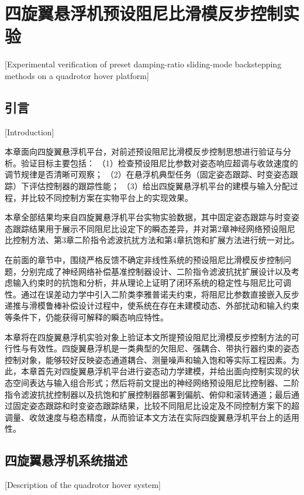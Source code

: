 
\chapter{四旋翼悬浮机预设阻尼比滑模反步控制实验}
[Experimental verification of preset damping-ratio sliding-mode backstepping methods on a quadrotor hover platform]

\section{引言}[Introduction]

本章面向四旋翼悬浮机平台，对前述预设阻尼比滑模反步控制思想进行验证与分析。验证目标主要包括：
（1）检查预设阻尼比参数对姿态响应超调与收敛速度的调节规律是否清晰可观察；
（2）在悬浮机典型任务（固定姿态跟踪、时变姿态跟踪）下评估控制器的跟踪性能；
（3）给出四旋翼悬浮机平台的建模与输入分配过程，并比较不同控制方案在实物平台上的实现效果。

本章全部结果均来自四旋翼悬浮机平台实物实验数据，其中固定姿态跟踪与时变姿态跟踪结果用于展示不同阻尼比设定下的瞬态差异，并对第2章神经网络预设阻尼比控制方法、第3章二阶指令滤波抗扰方法和第4章抗饱和扩展方法进行统一对比。

在前面的章节中，围绕严格反馈不确定非线性系统的预设阻尼比滑模反步控制问题，分别完成了神经网络补偿基准控制器设计、二阶指令滤波抗扰扩展设计以及考虑输入约束时的抗饱和分析，并从理论上证明了闭环系统的稳定性与阻尼比可调性。通过在误差动力学中引入二阶类李雅普诺夫约束，将阻尼比参数直接嵌入反步递推与滑模鲁棒补偿设计过程中，使系统在存在未建模动态、外部扰动和输入约束等条件下，仍能获得可解释的瞬态响应特性。

本章将在四旋翼悬浮机实验对象上验证本文所提预设阻尼比滑模反步控制方法的可行性与有效性。四旋翼悬浮机是一类典型的欠阻尼、强耦合、带执行器约束的姿态控制对象，能够较好反映姿态通道耦合、测量噪声和输入饱和等实际工程因素。为此，本章首先对四旋翼悬浮机平台进行姿态动力学建模，并给出面向控制实现的状态空间表达与输入组合形式；然后将前文提出的神经网络预设阻尼比控制器、二阶指令滤波抗扰控制器以及抗饱和扩展控制器部署到偏航、俯仰和滚转通道；最后通过固定姿态跟踪和时变姿态跟踪结果，比较不同阻尼比设定及不同控制方案下的超调量、收敛速度与稳态精度，从而验证本文方法在实际四旋翼悬浮机平台上的适用性。

\section{四旋翼悬浮机系统描述}[Description of the quadrotor hover system]

